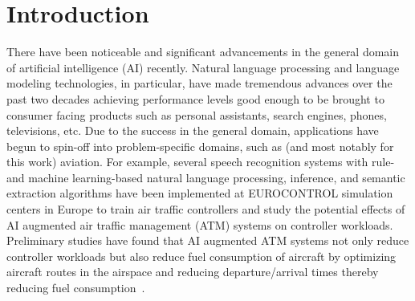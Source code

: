 \documentclass[12pt]{article}
\begin{document}
\section{Introduction}\label{sec:introduction}
There have been noticeable and significant advancements in the general domain of artificial intelligence (AI) recently. Natural language processing
and language modeling technologies, in particular, have made tremendous advances over the past two decades achieving performance levels good enough to
be brought to consumer facing products such as personal assistants, search engines, phones, televisions, etc. Due to the success in the general
domain, applications have begun to spin-off into problem-specific domains, such as (and most notably for this work) aviation. For example, several
speech recognition systems with rule- and machine learning-based natural language processing, inference, and semantic extraction algorithms have been
implemented at EUROCONTROL simulation centers in Europe to train air traffic controllers and study the potential effects of AI augmented air traffic
management (ATM) systems on controller workloads. Preliminary studies have found that AI augmented ATM systems not only reduce controller workloads
but also reduce fuel consumption of aircraft by optimizing aircraft routes in the airspace and reducing departure/arrival times thereby reducing fuel
consumption~\cite{helmke_quantifying_2017}.
\end{document}
